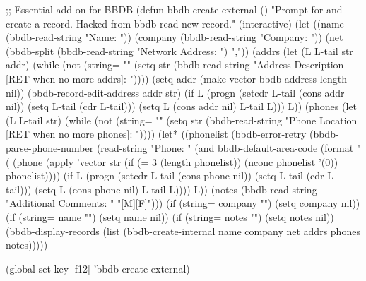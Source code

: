 ;; Essential add-on for BBDB
(defun bbdb-create-external ()
  "Prompt for and create a record.  Hacked from bbdb-read-new-record."
  (interactive)
  (let ((name (bbdb-read-string "Name: "))
(company (bbdb-read-string "Company: "))
(net (bbdb-split (bbdb-read-string "Network Address: ") ","))
(addrs
 (let (L L-tail str addr)
   (while
       (not
(string=
 ""
 (setq str
       (bbdb-read-string
"Address Description [RET when no more addrs]: "))))
     (setq addr (make-vector bbdb-address-length nil))
     (bbdb-record-edit-address addr str)
     (if L
 (progn (setcdr L-tail (cons addr nil))
(setq L-tail (cdr L-tail)))
       (setq L (cons addr nil)
     L-tail L)))
   L))
(phones
 (let (L L-tail str)
   (while
       (not
(string=
 ""
 (setq str
       (bbdb-read-string
"Phone Location [RET when no more phones]: "))))
     (let* ((phonelist
     (bbdb-error-retry
      (bbdb-parse-phone-number
       (read-string
"Phone: "
(and
 bbdb-default-area-code
 (format "(%
    (phone (apply 'vector str
  (if (= 3 (length phonelist))
      (nconc phonelist '(0))
    phonelist))))
       (if L
   (progn (setcdr L-tail (cons phone nil))
  (setq L-tail (cdr L-tail)))
 (setq L (cons phone nil)
       L-tail L))))
   L))
(notes (bbdb-read-string "Additional Comments: " "[M][F]")))
    (if (string= company "") (setq company nil))
    (if (string= name "") (setq name nil))
    (if (string= notes "") (setq notes nil))
    (bbdb-display-records
     (list
      (bbdb-create-internal name company net addrs phones notes)))))

(global-set-key [f12] 'bbdb-create-external)
